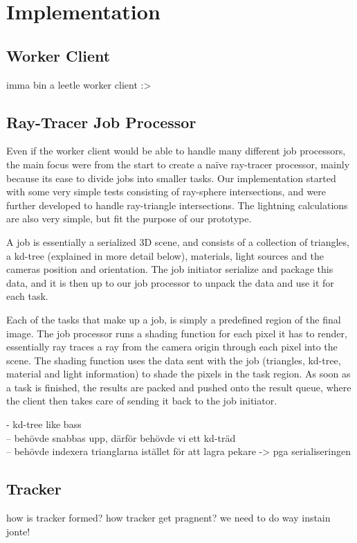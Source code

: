 \chapter{Implementation}

\section{Worker Client}
imma bin a leetle worker client :>

\section{Ray-Tracer Job Processor}
Even if the worker client would be able to handle many different job processors, the main focus were from the start to create a naïve ray-tracer processor, mainly because its ease to divide jobs into smaller tasks. Our implementation started with some very simple tests consisting of ray-sphere intersections, and were further developed to handle ray-triangle intersections. The lightning calculations are also very simple, but fit the purpose of our prototype.

A job is essentially a serialized 3D scene, and consists of a collection of triangles, a kd-tree (explained in more detail below), materials, light sources and the cameras position and orientation. The job initiator serialize and package this data, and it is then up to our job processor to unpack the data and use it for each task.

Each of the tasks that make up a job, is simply a predefined region of the final image. The job processor runs a shading function for each pixel it has to render, essentially ray traces a ray from the camera origin through each pixel into the scene. The shading function uses the data sent with the job (triangles, kd-tree, material and light information) to shade the pixels in the task region. As soon as a task is finished, the results are packed and pushed onto the result queue, where the client then takes care of sending it back to the job initiator.

- kd-tree like bass\\
  -- behövde snabbas upp, därför behövde vi ett kd-träd\\
  -- behövde indexera trianglarna istället för att lagra pekare -> pga serialiseringen\\
  
  

\section{Tracker}
how is tracker formed? how tracker get pragnent? we need to do way instain jonte!


